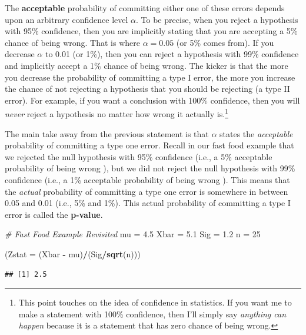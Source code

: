 \documentclass[
]{book}
\newenvironment{Shaded}{\begin{snugshade}}{\end{snugshade}}
\newcommand{\AttributeTok}[1]{\textcolor[rgb]{0.13,0.29,0.53}{#1}}
\newcommand{\CommentTok}[1]{\textcolor[rgb]{0.56,0.35,0.01}{\textit{#1}}}
\newcommand{\DecValTok}[1]{\textcolor[rgb]{0.00,0.00,0.81}{#1}}
\newcommand{\FloatTok}[1]{\textcolor[rgb]{0.00,0.00,0.81}{#1}}
\newcommand{\FunctionTok}[1]{\textcolor[rgb]{0.13,0.29,0.53}{\textbf{#1}}}
\newcommand{\NormalTok}[1]{#1}
\newcommand{\OtherTok}[1]{\textcolor[rgb]{0.56,0.35,0.01}{#1}}
\newcommand{\SpecialCharTok}[1]{\textcolor[rgb]{0.81,0.36,0.00}{\textbf{#1}}}
\begin{document}
The \textbf{acceptable} probability of committing either one of these errors depends upon an arbitrary confidence level \(\alpha\). To be precise, when you reject a hypothesis with 95\% confidence, then you are implicitly stating that you are accepting a 5\% chance of being wrong. That is where \(\alpha=0.05\) (or 5\% comes from). If you decrease \(\alpha\) to 0.01 (or 1\%), then you can reject a hypothesis with 99\% confidence and implicitly accept a 1\% chance of being wrong. The kicker is that the more you decrease the probability of committing a type I error, the more you increase the chance of not rejecting a hypothesis that you should be rejecting (a type II error). For example, if you want a conclusion with 100\% confidence, then you will \emph{never} reject a hypothesis no matter how wrong it actually is.\footnote{This point touches on the idea of confidence in statistics. If you want me to make a statement with 100\% confidence, then I'll simply say \emph{anything can happen} because it is a statement that has zero chance of being wrong.}

The main take away from the previous statement is that \(\alpha\) states the \emph{acceptable} probability of committing a type one error. Recall in our fast food example that we rejected the null hypothesis with 95\% confidence (i.e., a 5\% acceptable probability of being wrong ), but we did not reject the null hypothesis with 99\% confidence (i.e., a 1\% acceptable probability of being wrong ). This means that the \emph{actual} probability of committing a type one error is somewhere in between 0.05 and 0.01 (i.e., 5\% and 1\%). This actual probability of committing a type I error is called the \textbf{p-value}.

\begin{Shaded}
\begin{Highlighting}[]
\CommentTok{\# Fast Food Example Revisited}
\NormalTok{mu }\OtherTok{=} \FloatTok{4.5}
\NormalTok{Xbar }\OtherTok{=} \FloatTok{5.1}
\NormalTok{Sig }\OtherTok{=} \FloatTok{1.2}
\NormalTok{n }\OtherTok{=} \DecValTok{25}

\NormalTok{(}\AttributeTok{Zstat =}\NormalTok{ (Xbar }\SpecialCharTok{{-}}\NormalTok{ mu)}\SpecialCharTok{/}\NormalTok{(Sig}\SpecialCharTok{/}\FunctionTok{sqrt}\NormalTok{(n)))}
\end{Highlighting}
\end{Shaded}

\begin{verbatim}
## [1] 2.5
\end{verbatim}
\end{document}
